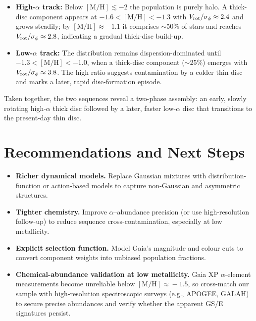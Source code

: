 \documentclass[a4paper,10pt]{article}
\begin{document}
\begin{multicols}{2}
\begin{itemize}
  \item \textbf{High-$\alpha$ track:} Below $\mathrm{[M/H]}\lesssim -2$ the population is purely halo.  
        A thick-disc component appears at $-1.6 < [\mathrm{M/H}] < -1.3$ with 
        $V_{\rm rot}/\sigma_\phi \approx 2.4$ and grows steadily; by 
        $[\mathrm{M/H}]\approx -1.1$ it comprises $\sim$50\% of stars and 
        reaches $V_{\rm rot}/\sigma_\phi \approx 2.8$, indicating a gradual 
        thick-disc build-up.
  \item \textbf{Low-$\alpha$ track:} The distribution remains dispersion-dominated 
        until $-1.3 < [\mathrm{M/H}] < -1.0$, when a thick-disc component 
        ($\sim$25\%) emerges with $V_{\rm rot}/\sigma_\phi \approx 3.8$.  
        The high ratio suggests contamination by a colder thin disc and marks a 
        later, rapid disc-formation episode.
\end{itemize}

Taken together, the two sequences reveal a two-phase assembly: an early, 
slowly rotating high-$\alpha$ thick disc followed by a later, faster low-$\alpha$ 
disc that transitions to the present-day thin disc.


\section*{Recommendations and Next Steps}

\begin{itemize}
\item \textbf{Richer dynamical models.} Replace Gaussian mixtures with distribution-function or 
action-based models to capture non-Gaussian and asymmetric structures.  
\item \textbf{Tighter chemistry.} Improve $\alpha$–abundance precision (or use high-resolution 
follow-up) to reduce sequence cross-contamination, especially at low metallicity.  
\item \textbf{Explicit selection function.} Model Gaia’s magnitude and colour cuts to convert 
component weights into unbiased population fractions.  
\item \textbf{Chemical-abundance validation at low metallicity.} Gaia XP $\alpha$-element 
measurements become unreliable below $\mathrm{[M/H]}\!\approx\!-1.5$, so cross-match our 
sample with high-resolution spectroscopic surveys (e.g., APOGEE, GALAH) to secure precise 
abundances and verify whether the apparent GS/E signatures persist.
\end{itemize}


\end{multicols}
\end{document}
